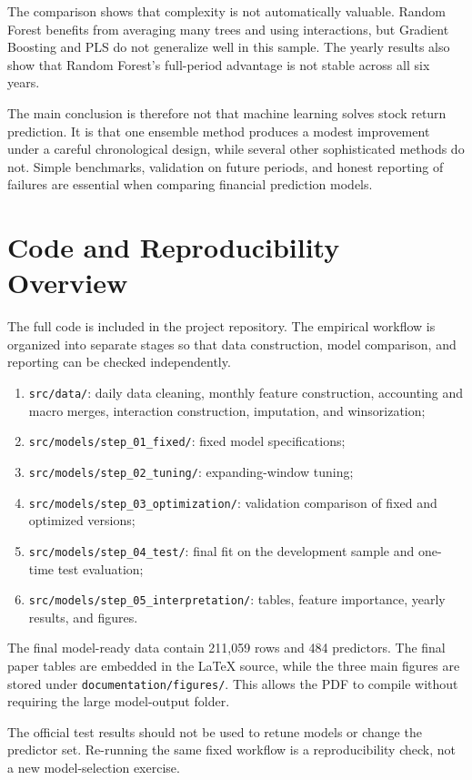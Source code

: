 \documentclass[11pt,a4paper]{article}
\begin{document}
The comparison shows that complexity is not automatically valuable. Random
Forest benefits from averaging many trees and using interactions, but Gradient
Boosting and PLS do not generalize well in this sample. The yearly results also
show that Random Forest's full-period advantage is not stable across all six
years.

The main conclusion is therefore not that machine learning solves stock return
prediction. It is that one ensemble method produces a modest improvement under
a careful chronological design, while several other sophisticated methods do
not. Simple benchmarks, validation on future periods, and honest reporting of
failures are essential when comparing financial prediction models.

\FloatBarrier
\printbibliography[heading=bibintoc,title={References}]

\clearpage
\appendix

\section{Code and Reproducibility Overview}
\label{app:code}

The full code is included in the project repository. The empirical workflow is
organized into separate stages so that data construction, model comparison, and
reporting can be checked independently.

\begin{enumerate}
  \item \texttt{src/data/}: daily data cleaning, monthly feature construction,
        accounting and macro merges, interaction construction, imputation, and
        winsorization;
  \item \texttt{src/models/step\_01\_fixed/}: fixed model specifications;
  \item \texttt{src/models/step\_02\_tuning/}: expanding-window tuning;
  \item \texttt{src/models/step\_03\_optimization/}: validation comparison of
        fixed and optimized versions;
  \item \texttt{src/models/step\_04\_test/}: final fit on the development
        sample and one-time test evaluation;
  \item \texttt{src/models/step\_05\_interpretation/}: tables, feature
        importance, yearly results, and figures.
\end{enumerate}

The final model-ready data contain 211,059 rows and 484 predictors. The final
paper tables are embedded in the LaTeX source, while the three main figures are
stored under \texttt{documentation/figures/}. This allows the PDF to compile
without requiring the large model-output folder.

The official test results should not be used to retune models or change the
predictor set. Re-running the same fixed workflow is a reproducibility check,
not a new model-selection exercise.
\end{document}
